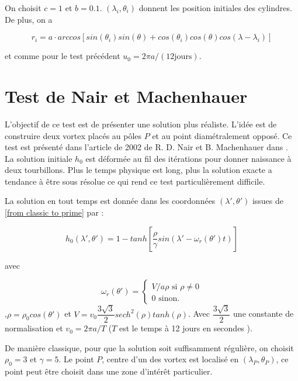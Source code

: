 On choisit $c=1$ et $b=0.1$. $(\lambda_i, \theta_i)$ donnent les position initiales des cylindres. De plus, on a 

\begin{equation}
r_i = a \cdot arccos \left[ sin ( \theta_i) sin( \theta) + cos( \theta_i) cos ( \theta) cos ( \lambda - \lambda_i ) \right]
\end{equation}

et comme pour le test précédent $u_0 = 2  \pi a / (12 \text{jours} )$.

\section{Test de Nair et Machenhauer}

L'objectif de ce test est de présenter une solution plus réaliste. L'idée est de construire deux vortex placés au pôles $P$ et au point diamétralement opposé. Ce test est présenté dans l'article de 2002 de R. D. Nair et B. Machenhauer dans \cite{Nair2002}.
La solution initiale $h_0$ est déformée au fil des itérations pour donner naissance à deux tourbillons. 
Plus le temps physique est long, plus la solution exacte a tendance à être sous résolue ce qui rend ce test particulièrement difficile.

La solution en tout temps est donnée dans les coordonnées $(\lambda', \theta' )$ issues de \eqref{from classic to prime} par :

\begin{equation}
\label{exact_machenhauer}
h_0(\lambda', \theta') = 1- tanh \left[ \dfrac{\rho}{\gamma} sin \left( \lambda' - \omega_r(\theta') t \right) \right]
\end{equation}

avec

\begin{equation}
\label{rotation_r}
\omega_r(\theta') = \left\lbrace
\begin{array}{ll}
V/a\rho \text{ si } \rho \neq 0\\
0 \text{ sinon.}
\end{array}
\right.
\end{equation}
,$\rho = \rho_0 cos ( \theta' )$ et $V =v_0 \dfrac{3 \sqrt{3}}{2} sech^2 ( \rho )  tanh( \rho )$. Avec $\dfrac{3 \sqrt{3}}{2}$ une constante de normalisation et $v_0 = 2 \pi a / T$ ($T$ est le temps à 12 jours en secondes ).

De manière classique, pour que la solution soit suffisamment régulière, on choisit $\rho_0 = 3$ et $\gamma = 5$.
Le point $P$, centre d'un des vortex est localisé en $( \lambda_P, \theta_P)$, ce point peut être choisit dans une zone d'intérêt particulier.

